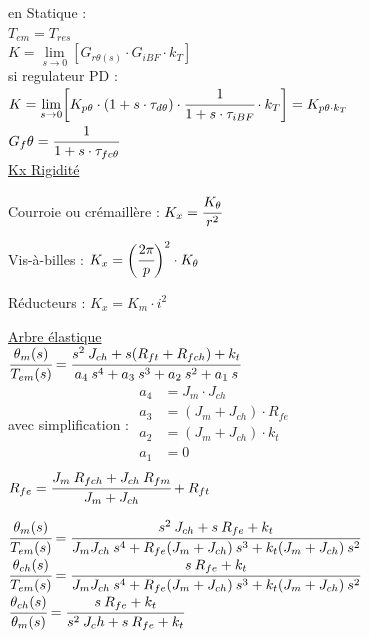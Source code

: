 \documentclass[	DIV=calc,%
							paper=a4,%
							fontsize=10pt,%
							twocolumn]{scrartcl} %
\newcommand{\formtitle}[1]{\large\underline{#1}}
\begin{document}
en Statique : \\
$T_{em} = T_{res}$\\

$K = \lim\limits_{s \rightarrow 0}[G_{r\theta(s)}\cdot G_{iBF}\cdot k_T]$\\

si regulateur PD : \\

$K = \lim\limits_{s \rightarrow 0}\biggl[K_{p\theta} \cdot (1+s\cdot\tau_{d\theta}) \cdot \cfrac{1}{1+s\cdot\tau_{iBF}} \cdot k_T\biggr] = K_{p\theta \cdot k_T}$\\

$G_f\theta = \cfrac{1}{1+s\cdot\tau_{fc\theta}}$\\

\formtitle{Kx Rigidité}

\vspace{3mm}

Courroie ou crémaillère : $K_x = \cfrac{K_\theta}{r^2}$

\vspace{3mm}

Vis-à-billes : $K_x = \bigg(\cfrac{2\pi}{p}\bigg)^2 \cdot K_\theta$


\vspace{3mm}

Réducteurs : $K_x = K_m \cdot i^2$ 

\vspace{3mm}

\underline{Arbre élastique }\\

$\cfrac{\theta_m(s)}{T_{em}(s)} = \cfrac{s^2\:J_{ch} + s(R_{ft} + R_{fch}) + k_t}{a_4\: s^4 + a_3\: s^3 + a_2 \:s^2 + a_1 \:s}$\\

avec simplification : 
{\normalsize
$
    \begin{aligned}
        a_4 &= J_m \cdot J_{ch}\\
        a_3 &=( J_m + J_{ch}) \cdot R_{fe}\\
        a_2 &= (J_m + J_{ch})\cdot k_t\\
        a_1 &= 0\\
    \end{aligned}
$
}\\

$R_{fe} = \cfrac{J_m \: R_{fch} + J_{ch}\:R_{fm}}{J_m + J_{ch}} + R_{ft}$

{\normalsize
$\cfrac{\theta_m(s)}{T_{em}(s)} = \cfrac{s^2\:J_{ch} + s\:R_{fe} + k_t}{J_mJ_{ch}\: s^4 + R_{fe}(J_m+J_{ch})\: s^3 + k_t(J_m+J_{ch}) \:s^2 }$\\


$\cfrac{\theta_{ch}(s)}{T_{em}(s)} = \cfrac{s\:R_{fe} + k_t}{J_mJ_{ch}\: s^4 + R_{fe}(J_m+J_{ch})\: s^3 + k_t(J_m+J_{ch}) \:s^2 }$\\


$\cfrac{\theta_{ch}(s)}{\theta_m(s)} = \cfrac{s\:R_{fe} + k_t}{s^2\: J_ch + s\:R_{fe} + k_t}$\\
}
\end{document}
